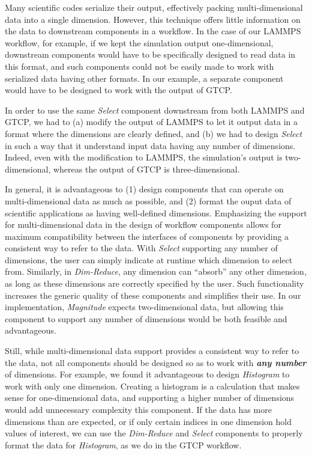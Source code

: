 \documentclass[conference]{IEEEtran}
\begin{document}
Many scientific codes serialize their output, effectively packing
multi-dimensional data into a single dimension. However, this technique offers
little information on the data to downstream components in a workflow. In the
case of our LAMMPS workflow, for example, if we kept the simulation output
one-dimensional, downstream components would have to be specifically designed
to read data in this format, and such components could not be easily made to
work with serialized data having other formats. In our example, a separate
component would have to be designed to work with the output of GTCP.

In order to use the same {\em Select} component downstream from both LAMMPS and
GTCP, we had to (a) modify the output of LAMMPS to let it output data in a
format where the dimensions are clearly defined, and (b) we had to design {\em
Select} in such a way that it understand input data having any number of
dimensions.  Indeed, even with the modification to LAMMPS, the simulation’s
output is two-dimensional, whereas the output of GTCP is three-dimensional.

In general, it is advantageous to (1) design components that can operate on
multi-dimensional data as much as possible, and (2) format the ouput data of
scientific applications as having well-defined dimensions. Emphasizing the
support for multi-dimensional data in the design of workflow components allows
for maximum compatibility between the interfaces of components by providing a
consistent way to refer to the data. With {\em Select} supporting any number of
dimensions, the user can simply indicate at runtime which dimension to select
from. Similarly, in {\em Dim-Reduce}, any dimension can ``absorb'' any other
dimension, as long as these dimensions are correctly specified by the user.
Such functionality increases the generic quality of these components and
simplifies their use. In our implementation, {\em Magnitude} expects
two-dimensional data, but allowing this component to support any number of
dimensions would be both feasible and advantageous.

Still, while multi-dimensional data support provides a consistent way to refer
to the data, not all components should be designed so as to work with
\textbf{\em any number} of dimensions. For example, we found it advantageous to
design {\em Histogram} to work with only one dimension. Creating a histogram is
a calculation that makes sense for one-dimensional data, and supporting a
higher number of dimensions would add unnecessary complexity this component. If
the data has more dimensions than are expected, or if only certain indices in
one dimension hold values of interest, we can use the {\em Dim-Reduce} and {\em
Select} components to properly format the data for {\em Histogram}, as we do in
the GTCP workflow.
\end{document}

